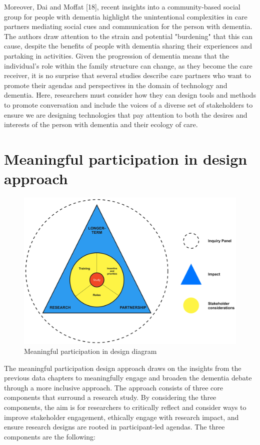 Moreover, Dai and Moffat [18], recent insights into a community-based social group for people with dementia highlight the unintentional complexities in care partners mediating social cues and communication for the person with dementia. The authors draw attention to the strain and potential "burdening" that this can cause, despite the benefits of people with dementia sharing their experiences and partaking in activities. Given the progression of dementia means that the individual's role within the family structure can change, as they become the care receiver, it is no surprise that several studies describe care partners who want to promote their agendas and perspectives in the domain of technology and dementia. Here, researchers must consider how they can design tools and methods to promote conversation and include the voices of a diverse set of stakeholders to ensure we are designing technologies that pay attention to both the desires and interests of the person with dementia and their ecology of care.







\section{Meaningful participation in design approach}
\label{Discussion:Design}

\begin{figure}[htp]
\centering
\includegraphics[width=0.8\linewidth]{Images/Discussion/DesignApproach.jpg}
\caption{Meaningful participation in design diagram}
\label{fig:MeaningfulParticipation}
\end{figure}
The meaningful participation design approach draws on the insights from the previous data chapters to meaningfully engage and broaden the dementia debate through a more inclusive approach. The approach consists of three core components that surround a research study. By considering the three components, the aim is for researchers to critically reflect and consider ways to improve stakeholder engagement, ethically engage with research impact, and ensure research designs are rooted in participant-led agendas. The three components are the following:

